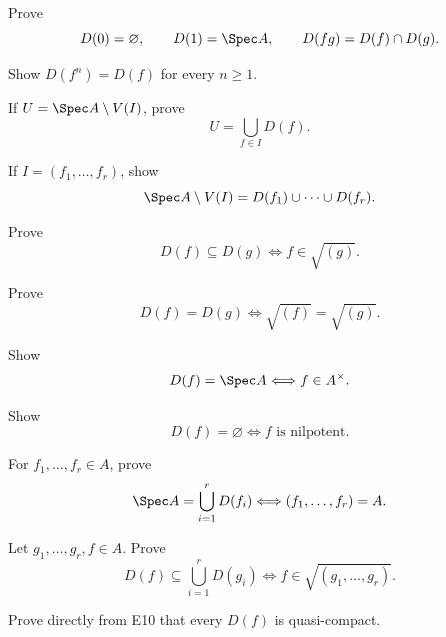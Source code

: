 \begin{exercise}
Prove
\[
D(0)=\varnothing,\qquad D(1)=\Spec A,\qquad D(fg)=D(f)\cap D(g).
\]
\end{exercise}

\begin{exercise}[VI.08.E2 - Powers]
Show $D(f^n)=D(f)$ for every $n\ge1$.
\end{exercise}

\begin{exercise}
If $U=\Spec A\setminus V(I)$, prove
\[
U=\bigcup_{f\in I}D(f).
\]
\end{exercise}

\begin{exercise}
If $I=(f_1,\dots,f_r)$, show
\[
\Spec A\setminus V(I)=D(f_1)\cup\cdots\cup D(f_r).
\]
\end{exercise}

\begin{exercise}
Prove
\[
D(f)\subseteq D(g)\Longleftrightarrow f\in\sqrt{(g)}.
\]
\end{exercise}

\begin{exercise}
Prove
\[
D(f)=D(g)\Longleftrightarrow \sqrt{(f)}=\sqrt{(g)}.
\]
\end{exercise}

\begin{exercise}[VI.08.E7 - Units]
Show
\[
D(f)=\Spec A\Longleftrightarrow f\in A^\times.
\]
\end{exercise}

\begin{exercise}[VI.08.E8 - Nilpotents]
Show
\[
D(f)=\varnothing\Longleftrightarrow f\text{ is nilpotent}.
\]
\end{exercise}

\begin{exercise}
For $f_1,\dots,f_r\in A$, prove
\[
\Spec A=\bigcup_{i=1}^rD(f_i)
\Longleftrightarrow
(f_1,\dots,f_r)=A.
\]
\end{exercise}

\begin{exercise}
Let $g_1,\dots,g_r,f\in A$.  Prove
\[
D(f)\subseteq\bigcup_{i=1}^rD(g_i)
\Longleftrightarrow
f\in\sqrt{(g_1,\dots,g_r)}.
\]
\end{exercise}

\begin{exercise}
Prove directly from E10 that every $D(f)$ is quasi-compact.
\end{exercise}

